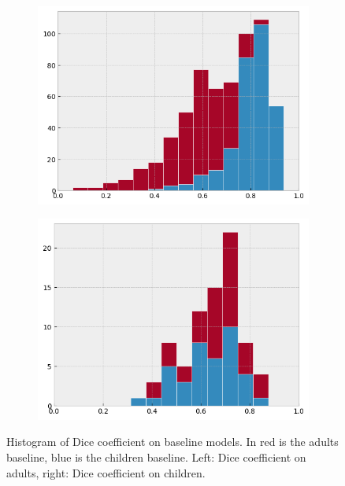 \begin{figure}[htb]
  \begin{subfigure}[b]{0.5\linewidth}
    \centering
    \includegraphics[width=0.95\linewidth]{img_transfer/hist_adults} 
  \end{subfigure}%
  \begin{subfigure}[b]{0.5\linewidth}
    \centering
    \includegraphics[width=0.95\linewidth]{img_transfer/hist_children} 
  \end{subfigure} 
  \caption[Histogram of Dice coefficient on baseline models]{Histogram of Dice coefficient on baseline models. In red is the adults baseline, blue is the children baseline. Left: Dice coefficient on adults, right: Dice coefficient on children.}
  \label{fig:hist} 
\end{figure}

